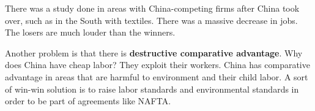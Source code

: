 \documentclass{article}
\begin{document}
There was a study done in areas with China-competing firms after China took
over, such as in the South with textiles. There was a massive decrease in jobs.
The losers are much louder than the winners.

Another problem is that there is \textbf{destructive comparative advantage}. Why
does China have cheap labor? They exploit their workers. China has comparative
advantage in areas that are harmful to environment and their child labor. A sort
of win-win solution is to raise labor standards and environmental standards in
order to be part of agreements like NAFTA.
\end{document}
